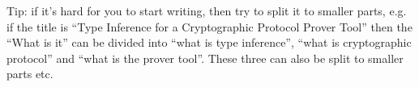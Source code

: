 \documentclass[..thesis.tex]{subfiles}
\begin{document}

Tip: if it's hard for you to start writing, then try to split it to smaller parts, e.g. if the title is ``Type Inference for a Cryptographic Protocol Prover Tool'' then the ``What is it'' can be divided into ``what is type inference'', ``what is cryptographic protocol'' and ``what is the prover tool''. These three can also be split to smaller parts etc.
\end{document}
